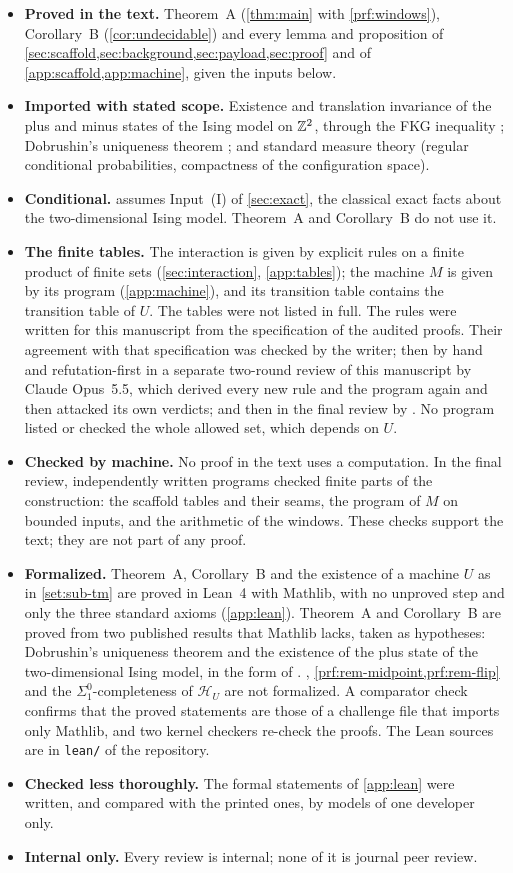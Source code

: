 \begin{itemize}
\item \textbf{Proved in the text.} Theorem~A (\cref{thm:main} with \cref{prf:windows}), Corollary~B (\cref{cor:undecidable}) and every lemma and proposition of \cref{sec:scaffold,sec:background,sec:payload,sec:proof} and of \cref{app:scaffold,app:machine}, given the inputs below.
\item \textbf{Imported with stated scope.} Existence and translation invariance of the plus and minus states of the Ising model on $\mathbb{Z}^2$, through the FKG inequality \cite{FriedliVelenik17}; Dobrushin's uniqueness theorem \cite{Dobrushin68,Georgii11}; and standard measure theory (regular conditional probabilities, compactness of the configuration space).
\item \textbf{Conditional.}  assumes Input~(I) of \cref{sec:exact}, the classical exact facts about the two-dimensional Ising model. Theorem~A and Corollary~B do not use it.
\item \textbf{The finite tables.} The interaction is given by explicit rules on a finite product of finite sets (\cref{sec:interaction}, \cref{app:tables}); the machine $M$ is given by its program (\cref{app:machine}), and its transition table contains the transition table of $U$. The tables were not listed in full. The rules were written for this manuscript from the specification of the audited proofs. Their agreement with that specification was checked by the writer; then by hand and refutation-first in a separate two-round review of this manuscript by Claude Opus~5.5, which derived every new rule and the program again and then attacked its own verdicts; and then in the final review by \OPENAIMODEL{}. No program listed or checked the whole allowed set, which depends on $U$.
\item \textbf{Checked by machine.} No proof in the text uses a computation. In the final review, independently written programs checked finite parts of the construction: the scaffold tables and their seams, the program of $M$ on bounded inputs, and the arithmetic of the windows. These checks support the text; they are not part of any proof.
\item \textbf{Formalized.} Theorem~A, Corollary~B and the existence of a machine $U$ as in \cref{set:sub-tm} are proved in Lean~4 with Mathlib, with no unproved step and only the three standard axioms (\cref{app:lean}). Theorem~A and Corollary~B are proved from two published results that Mathlib lacks, taken as hypotheses: Dobrushin's uniqueness theorem and the existence of the plus state of the two-dimensional Ising model, in the form of \cite{FriedliVelenik17}. , \cref{prf:rem-midpoint,prf:rem-flip} and the $\Sigma^0_1$-completeness of $\mathcal H_U$ are not formalized. A comparator check confirms that the proved statements are those of a challenge file that imports only Mathlib, and two kernel checkers re-check the proofs. The Lean sources are in \texttt{lean/} of the repository.
\item \textbf{Checked less thoroughly.} The formal statements of \cref{app:lean} were written, and compared with the printed ones, by models of one developer only.
\item \textbf{Internal only.} Every review is internal; none of it is journal peer review.
\end{itemize}
